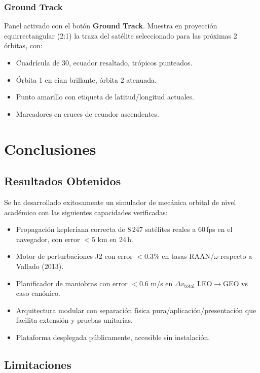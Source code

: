 \documentclass[12pt,a4paper]{article}
\newcommand{\dvtot}{\Delta v_{\text{total}}}
\begin{document}
\subsubsection{Ground Track}

Panel activado con el bot\'on \textbf{Ground Track}. Muestra en proyecci\'on equirrectangular (2:1) la traza del sat\'elite seleccionado para las pr\'oximas 2 \'orbitas, con:
\begin{itemize}
  \item Cuadr\'icula de 30\degree, ecuador resaltado, tr\'opicos punteados.
  \item \'Orbita 1 en cian brillante, \'orbita 2 atenuada.
  \item Punto amarillo con etiqueta de latitud/longitud actuales.
  \item Marcadores en cruces de ecuador ascendentes.
\end{itemize}

\section{Conclusiones}

\subsection{Resultados Obtenidos}

Se ha desarrollado exitosamente un simulador de mec\'anica orbital de nivel acad\'emico con las siguientes capacidades verificadas:

\begin{itemize}
  \item Propagaci\'on kepleriana correcta de 8\,247 sat\'elites reales a 60\,fps en el navegador, con error $< 5$ km en 24\,h.
  \item Motor de perturbaciones J2 con error $<0.3\%$ en tasas RAAN/$\omega$ respecto a Vallado (2013).
  \item Planificador de maniobras con error $<0.6$ m/s en $\dvtot$ LEO$\to$GEO vs caso can\'onico.
  \item Arquitectura modular con separaci\'on f\'isica pura/aplicaci\'on/presentaci\'on que facilita extensi\'on y pruebas unitarias.
  \item Plataforma desplegada p\'ublicamente, accesible sin instalaci\'on.
\end{itemize}

\subsection{Limitaciones}
\end{document}
